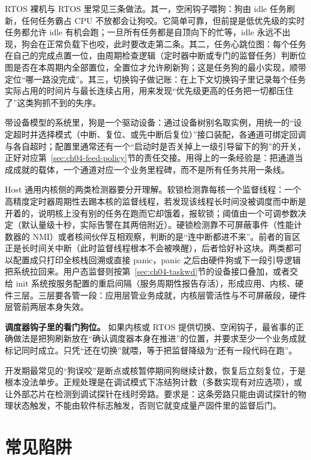 \documentclass[12pt,a4paper,fontset=fandol]{ctexbook}
\newcommand{\Lang}[1]{\textsf{#1}}
\newcommand{\DomRtos}{\Lang{RTOS}}
\newcommand{\DomHost}{\Lang{Host}}
\begin{document}
\DomRtos{} 裸机与 RTOS 里常见三条做法。其一，空闲钩子喂狗：狗由 idle 任务刷新，任何任务霸占 CPU 不放都会让狗咬。它简单可靠，但前提是低优先级的实时任务都允许 idle 有机会跑；一旦所有任务都是自顶向下的忙等，idle 永远不出现，狗会在正常负载下也咬，此时要改走第二条。其二，任务心跳位图：每个任务在自己的完成点置一位，由周期检查逻辑（定时器中断或专门的监督任务）判断位图是否在本周期内全部置位，全置位才允许刷新狗；这是任务狗的最小实现，顺带定位``哪一路没完成''。其三，切换钩子做记账：在上下文切换钩子里记录每个任务实际占用的时间片与最长连续占用，用来发现``优先级更高的任务把一切都压住了''这类狗抓不到的失序。

带设备模型的系统里，狗是一个驱动设备：通过设备树别名取实例，用统一的``设定超时并选择模式（中断、复位、或先中断后复位）''接口装配，各通道可绑定回调与各自超时；配置里通常还有一个``启动时是否关掉上一级引导留下的狗''的开关，正好对应第~\ref{sec:ch04-feed-policy}节的责任交接。用得上的一条经验是：把通道当成成就的载体，一个通道对应一个业务里程碑，而不是所有任务共用一条线。

\DomHost{} 通用内核侧的两类检测器要分开理解。软锁检测靠每核一个监督线程：一个高精度定时器周期性去踢本核的监督线程，若发现该线程长时间没被调度而中断是开着的，说明核上没有别的任务在跑而它却饿着，报软锁；阈值由一个可调参数决定（默认量级十秒，实际告警在其两倍附近）。硬锁检测靠不可屏蔽事件（性能计数器的 NMI）或者核间伙伴互相观察，判断的是``连中断都进不来''。前者的盲区正是长时间关中断（此时监督线程根本不会被唤醒），后者恰好补这块。两类都可以配置成只打印全核栈回溯或直接 panic，panic 之后由硬件狗或下一段引导逻辑把系统拉回来。用户态监督则按第~\ref{sec:ch04-taskwd}节的设备接口叠加，或者交给 init 系统按服务配置的重启间隔（服务周期性报告存活），形成应用、内核、硬件三层。三层要各管一段：应用层管业务成就，内核层管活性与不可屏蔽段，硬件层管前两层本身失效。

\textbf{调度器钩子里的看门狗位。} 如果内核或 RTOS 提供切换、空闲钩子，最省事的正确做法是把狗刷新放在``确认调度器本身在推进''的位置，并要求至少一个业务成就标记同时成立。只凭``还在切换''就喂，等于把监督降级为``还有一段代码在跑''。

\begin{warning}[title={调试器 halt 触发复位导致无法单步}]
开发期最常见的``狗误咬''是断点或核暂停期间狗继续计数，恢复后立刻复位，于是根本没法单步。正规处理是在调试模式下冻结狗计数（多数实现有对应选项），或让外部芯片在检测到调试探针在线时旁路。要求是：这条旁路只能由调试探针的物理状态触发，不能由软件标志触发，否则它就变成量产固件里的监督后门。
\end{warning}

\section{常见陷阱}
\end{document}
